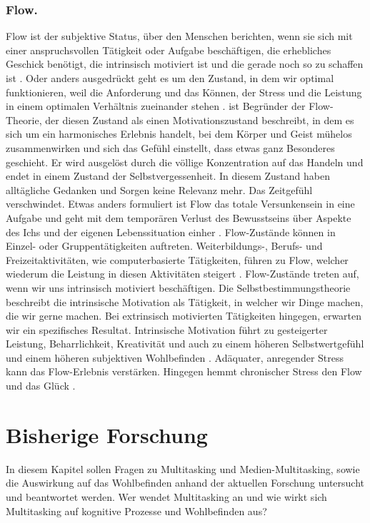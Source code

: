 \subsubsection{Flow.}
Flow ist der subjektive Status, über den Menschen berichten, wenn sie sich mit einer anspruchsvollen Tätigkeit oder Aufgabe beschäftigen, die erhebliches Geschick benötigt, die intrinsisch motiviert ist und die gerade noch so zu schaffen ist \cite{Nakamura2009}. Oder anders ausgedrückt geht es um den Zustand, in dem wir optimal funktionieren, weil die Anforderung und das Können, der Stress und die Leistung in einem optimalen Verhältnis zueinander stehen \cite{Esch2014}.  ist Begründer der Flow-Theorie, der diesen Zustand als einen Motivationszustand beschreibt, in dem es sich um ein harmonisches Erlebnis handelt, bei dem Körper und Geist mühelos zusammenwirken und sich das Gefühl einstellt, dass etwas ganz Besonderes geschieht. Er wird ausgelöst durch die völlige Konzentration auf das Handeln und endet in einem Zustand der Selbstvergessenheit. In diesem Zustand haben alltägliche Gedanken und Sorgen keine Relevanz mehr. Das Zeitgefühl verschwindet. Etwas anders formuliert ist Flow das totale Versunkensein in eine Aufgabe und geht mit dem temporären Verlust des Bewusstseins über Aspekte des Ichs und der eigenen Lebenssituation einher \cite{Nakamura2009}. Flow-Zustände können in Einzel- oder Gruppentätigkeiten auftreten. Weiterbildungs-, Berufs- und Freizeitaktivitäten, wie computerbasierte Tätigkeiten, führen zu Flow, welcher wiederum die Leistung in diesen Aktivitäten steigert \cite{Carr2011}. Flow-Zustände treten auf, wenn wir uns intrinsisch motiviert beschäftigen. Die Selbstbestimmungstheorie beschreibt die intrinsische Motivation als Tätigkeit, in welcher wir Dinge machen, die wir gerne machen. Bei extrinsisch motivierten Tätigkeiten hingegen, erwarten wir ein spezifisches Resultat. Intrinsische Motivation führt zu gesteigerter Leistung, Beharrlichkeit, Kreativität und auch zu einem höheren Selbstwertgefühl und einem höheren subjektiven Wohlbefinden \cite{Deci1985}. Adäquater, anregender Stress kann das Flow-Erlebnis verstärken. Hingegen hemmt chronischer Stress den Flow und das Glück \cite{Esch2014}.

\section{Bisherige Forschung}\label{section.bisherigeForschung}
In diesem Kapitel sollen Fragen zu Multitasking und Medien-Multitasking, sowie die Auswirkung auf das Wohlbefinden anhand der aktuellen Forschung untersucht und beantwortet werden. Wer wendet Multitasking an und wie wirkt sich Multitasking auf kognitive Prozesse und Wohlbefinden aus?

